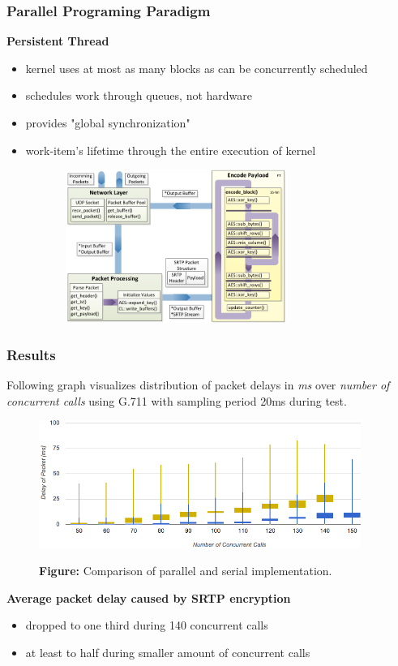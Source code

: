 \documentclass[10pt, xcolor=pdflatex, dvipsnames, table]{beamer}
\begin{document}
\begin{frame}
\frametitle{Parallel Programing Paradigm}
\textbf{Persistent Thread}
\begin{itemize}
\item kernel uses at most as many blocks as can be concurrently scheduled
\item schedules work through queues, not hardware
\item provides "global synchronization"
\item work-item's lifetime through the entire execution of kernel
\end{itemize}

\begin{figure}[H]
\centering
\includegraphics[width=9cm,height=5cm]{img/paral_scheme.pdf}
\end{figure}
\end{frame}



\begin{frame}
\frametitle{Results}
\footnotesize{Following graph visualizes distribution of packet delays in \textit{ms} over
\textit{number of concurrent calls} using G.711 with sampling period 20ms during test.}

\begin{figure}[H]
\centering
\includegraphics[width=10.5cm,keepaspectratio]{img/compare.png}

\footnotesize{\textbf{Figure:} Comparison of parallel and serial implementation.}
\end{figure}

\textbf{Average packet delay caused by SRTP encryption}
  \begin{itemize}
    \item dropped to one third during 140 concurrent calls 
    \item at least to half during smaller amount of concurrent calls
  \end{itemize}
\end{frame}
\end{document}
